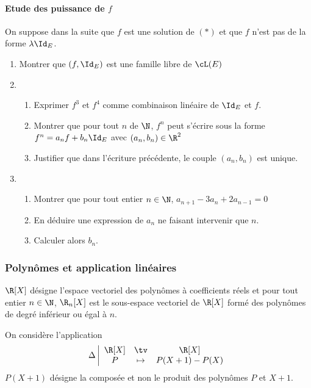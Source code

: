 \paragraph{Etude des puissance de $f$}
On suppose dans la suite que $f$ est une solution de $(*)$ et que $f$ n'est pas de la forme $\lambda \Id_E$. 
\begin{enumerate}
\item Montrer que $(f, \Id_E)$ est une famille libre de $\cL(E)$
\item \begin{enumerate}
\item Exprimer $f^3$ et $f^4$ comme combinaison linéaire de $\Id_E$ et $f$. 
\item Montrer que pour tout $n$ de $\N$, $f^n$ peut s'écrire sous la forme $f^n = a_n f +b_n \Id_E$ avec $(a_n,b_n) \in \R^2$
\item Justifier que dans l'écriture précédente, le couple $(a_n,b_n) $ est unique.

\end{enumerate}
\item \begin{enumerate}
\item Montrer que pour tout entier $n\in \N$, $a_{n+1} -3a_n +2a_{n-1} = 0$
\item En déduire une expression de $a_n$ ne faisant intervenir que $n$. 
\item Calculer alors $b_n$.
\end{enumerate}

\end{enumerate}



\subsubsection{Polynômes et application linéaires}
$\R[X]$ désigne l'espace vectoriel des polynômes à coefficients réels et pour tout entier $n\in \N$, 
$\R_n[X]$ est le sous-espace vectoriel de $\R[X]$ formé des polynômes de degré inférieur ou égal à $n$.

On considère l'application $$\Delta \left|\begin{array}{ccc}
\R[X] & \tv & \R[X]\\
P &\mapsto  & P(X+1) -P(X)
\end{array}\right.$$
$P(X+1)$ désigne la composée et non le produit des polynômes $P$ et $X+1$.
